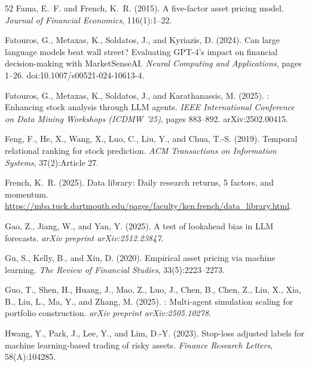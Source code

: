 {\begin{thebibliography}{52}
Fama, E.~F. and French, K.~R. (2015).
\newblock A five-factor asset pricing model.
\newblock \emph{Journal of Financial Economics}, 116(1):1--22.

Fatouros, G., Metaxas, K., Soldatos, J., and Kyriazis, D. (2024).
\newblock Can large language models beat wall street? {E}valuating {GPT-4}'s impact on financial decision-making with {MarketSenseAI}.
\newblock \emph{Neural Computing and Applications}, pages 1--26. doi:10.1007/s00521-024-10613-4.

Fatouros, G., Metaxas, K., Soldatos, J., and Karathanassis, M. (2025).
: Enhancing stock analysis through {LLM} agents.
\newblock \emph{IEEE International Conference on Data Mining Workshops (ICDMW '25)}, pages 883--892. arXiv:2502.00415.

Feng, F., He, X., Wang, X., Luo, C., Liu, Y., and Chua, T.-S. (2019).
\newblock Temporal relational ranking for stock prediction.
\newblock \emph{ACM Transactions on Information Systems}, 37(2):Article 27.

French, K.~R. (2025).
\newblock Data library: Daily research returns, 5 factors, and momentum.
\newblock \url{https://mba.tuck.dartmouth.edu/pages/faculty/ken.french/data_library.html}.

Gao, Z., Jiang, W., and Yan, Y. (2025).
\newblock A test of lookahead bias in {LLM} forecasts.
\newblock \emph{arXiv preprint arXiv:2512.23847}.

Gu, S., Kelly, B., and Xiu, D. (2020).
\newblock Empirical asset pricing via machine learning.
\newblock \emph{The Review of Financial Studies}, 33(5):2223--2273.

Guo, T., Shen, H., Huang, J., Mao, Z., Luo, J., Chen, B., Chen, Z., Liu, X., Xia, B., Liu, L., Ma, Y., and Zhang, M. (2025).
: Multi-agent simulation scaling for portfolio construction.
\newblock \emph{arXiv preprint arXiv:2505.10278}.

Hwang, Y., Park, J., Lee, Y., and Lim, D.-Y. (2023).
\newblock Stop-loss adjusted labels for machine learning-based trading of risky assets.
\newblock \emph{Finance Research Letters}, 58(A):104285.


\end{thebibliography}}
